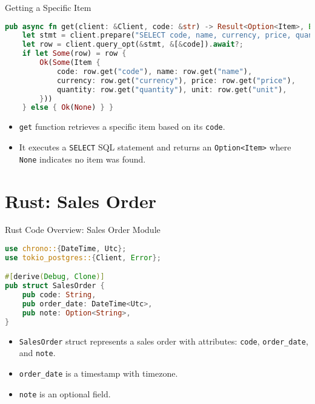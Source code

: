 \documentclass[aspectratio=169, table]{beamer}
\begin{document}
\begin{frame}[fragile]{Getting a Specific Item}
\vspace{15pt}
\begin{lstlisting}[language=Rust]
pub async fn get(client: &Client, code: &str) -> Result<Option<Item>, Error> {
	let stmt = client.prepare("SELECT code, name, currency, price, quantity, unit FROM item WHERE code = $1").await?;
	let row = client.query_opt(&stmt, &[&code]).await?;
	if let Some(row) = row {
		Ok(Some(Item {
			code: row.get("code"), name: row.get("name"),
			currency: row.get("currency"), price: row.get("price"),
			quantity: row.get("quantity"), unit: row.get("unit"),
		}))
	} else { Ok(None) } }
\end{lstlisting}

\begin{itemize}
\item \texttt{get} function retrieves a specific item based on its \texttt{code}.
\item It executes a \texttt{SELECT} SQL statement and returns an \texttt{Option<Item>} where \texttt{None} indicates no item was found.
\end{itemize}
\end{frame}

\section{Rust: Sales Order}
\begin{frame}[fragile]{Rust Code Overview: Sales Order Module}
\begin{lstlisting}[language=Rust]
use chrono::{DateTime, Utc};
use tokio_postgres::{Client, Error};

#[derive(Debug, Clone)]
pub struct SalesOrder {
	pub code: String,
	pub order_date: DateTime<Utc>,
	pub note: Option<String>,
}
\end{lstlisting}

\begin{itemize}
\item \texttt{SalesOrder} struct represents a sales order with attributes: \texttt{code}, \texttt{order\_date}, and \texttt{note}.
\item \texttt{order\_date} is a timestamp with timezone.
\item \texttt{note} is an optional field.
\end{itemize}
\end{frame}
\end{document}
